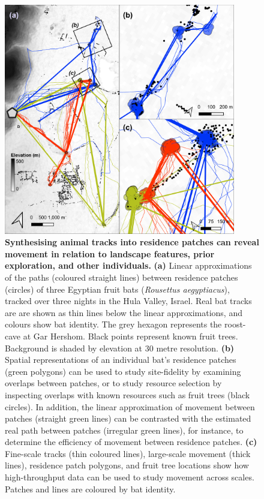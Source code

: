     \begin{figure}[ht!]
        \centering
        \includegraphics[width=0.9\textwidth]{figures/preprocessing/fig_08.png}
        \caption{
            \textbf{Synthesising animal tracks into residence patches can reveal movement in relation to landscape features, prior exploration, and other individuals.}
            \textbf{(a)} Linear approximations of the paths (coloured straight lines) between residence patches (circles) of three Egyptian fruit bats (\textit{Rousettus aegyptiacus}), tracked over three nights in the Hula Valley, Israel.
            Real bat tracks are are shown as thin lines below the linear approximations, and colours show bat identity. The grey hexagon represents the roost-cave at Gar Hershom.
            Black points represent known fruit trees.
            Background is shaded by elevation at 30 metre resolution.
            \textbf{(b)} Spatial representations of an individual bat's residence patches (green polygons) can be used to study site-fidelity by examining overlaps between patches, or to study resource selection by inspecting overlaps with known resources such as fruit trees (black circles).
            In addition, the linear approximation of movement between patches (straight green lines) can be contrasted with the estimated real path between patches (irregular green lines), for instance, to determine the efficiency of movement between residence patches.
            \textbf{(c)} Fine-scale tracks (thin coloured lines), large-scale movement (thick lines), residence patch polygons, and fruit tree locations show how high-throughput data can be used to study movement across scales.
            Patches and lines are coloured by bat identity.
        }
        \label{preproc_fig_08}
    \end{figure}

